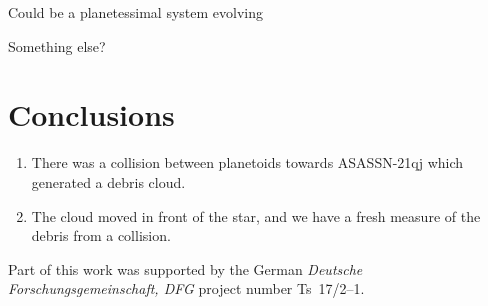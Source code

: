 \documentclass{aa}
\begin{document}
Could be a planetessimal system evolving

Something else?


\section{Conclusions}

   \begin{enumerate}
      \item There was a collision between planetoids towards ASASSN-21qj which generated a debris cloud.
      \item The cloud moved in front of the star, and we have a fresh measure of the debris from a collision.
   \end{enumerate}

\begin{acknowledgements}
      Part of this work was supported by the German
      \emph{Deut\-sche For\-schungs\-ge\-mein\-schaft, DFG\/} project
      number Ts~17/2--1.
\end{acknowledgements}

%
%


\end{document}
